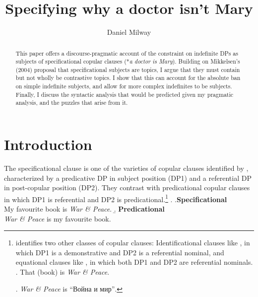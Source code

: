 \documentclass[letterpaper]{article}
\title{Specifying why a doctor isn't Mary}
\author{Daniel Milway%
}
\date{}
\begin{document}
\maketitle
\begin{abstract}
  This paper offers a discourse-pragmatic account of the constraint on indefinite DPs as subjects of specificational copular clauses (*\textit{a doctor is Mary}).
  Building on Mikkelsen's (2004) proposal that specificational subjects are topics, I argue that they must contain but not wholly be contrastive topics.
  I show that this can account for the absolute ban on simple indefinite subjects, and allow for more complex indefinites to be subjects.
  Finally, I discuss the syntactic analysis that would be predicted given my pragmatic analysis, and the puzzles that arise from it.
\end{abstract}
\doublespacing
\section{Introduction}
The specificational clause is one of the varieties of copular clauses identified by \textcite{higgins1973pseudo}, characterized by a predicative DP in subject position (DP1) and a referential DP in post-copular position (DP2).
They contrast with predicational copular clauses in which DP1 is referential and DP2 is predicational.\footnote{
	\textcite{higgins1973pseudo} identifies two other classes of copular clauses:
	Identificational clauses like \Next, in which DP1 is a demonstrative and DP2 is a referential nominal, and equational clauses like \NNext, in which both DP1 and DP2 are referential nominals.
	\ex. That (book) is \textit{War \& Peace}.

	\ex. \textit{War \& Peace} is \foreignlanguage{russian}{``Война и мир''}.

}
\ex.
\a.\textbf{Specificational}\\
My favourite book is \textit{War \& Peace}.
\b. \textbf{Predicational}\\
\textit{War \& Peace} is my favourite book.
\end{document}
